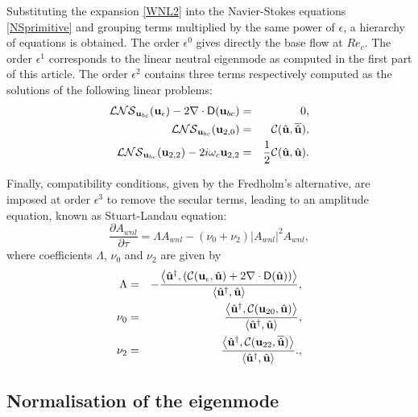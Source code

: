 \documentclass[twocolumn,10pt]{asme2ej}
\newcommand{\be}[1]{ \begin{equation} \label{#1}}
\newcommand{\ee}{\end{equation}}
\begin{document}
Substituting the expansion \ref{WNL2} into the Navier-Stokes equations \ref{NSprimitive} and grouping terms multiplied by the same power of $\epsilon$, a hierarchy of equations is obtained. The order $\epsilon^0$ gives directly the base flow at $Re_c$. The order $\epsilon^1$
corresponds to the linear neutral eigenmode as computed in the first part of this article.
The order $\epsilon^2$ contains three terms respectively computed as the solutions of the following linear problems:
\begin{eqnarray}
 {\cal LNS}_{{\bf u}_{bc}} ({\bf u}_\epsilon) - 2 \nabla \cdot {\mathsf D}({\bf u}_{bc}) &=&0,
\label{eq:LL1} \\
{\cal LNS}_{{\bf u}_{bc}} ({\bf u}_{2,0}) &=& {\cal C}(\hat{\bf u},\overline{\hat{\bf u}}), \label{eq:LL2} \\
{\cal LNS}_{{\bf u}_{bc}} ({\bf u}_{2,2}) - 2 i \omega_c {\bf u}_{2,2}  &=& \frac{1}{2} {\cal C}(\hat{\bf u},\hat{\bf u}). \label{eq:LL3}
 \end{eqnarray}

Finally, compatibility conditions, given by the Fredholm's alternative, are imposed at order $\epsilon^3$ to remove the secular terms, leading to an amplitude equation, known as Stuart-Landau equation:
\be{WNL3_2}
\frac{\partial A_{wnl}}{\partial \tau} = \Lambda A_{wnl} - (\nu_0+\nu_2)  |A_{wnl}|^2 A_{wnl},
\ee
where coefficients $\Lambda$, $\nu_0$ and $\nu_2$ are given by
\begin{eqnarray}
\Lambda &=& -\frac{ \left< {\hat{\bf u}}^\dag, 
\left( {\cal C}({\bf u}_\epsilon, \hat{\bf u}) + 2 \nabla \cdot  {\mathsf D}( \hat{\bf u}) \right) \right>}
{  \left<  \hat{\bf u}^\dag,\hat{\bf u} \right> },\label{LAMBDA}\\
\nu_0 &=& \frac{ \left< {\hat{\bf u}}^\dag,  {\cal C}({\bf u}_{20}, \hat{\bf u} ) \right>}
{  \left<  \hat{\bf u}^\dag,\hat{\bf u} \right> },\label{NU0}\\
\nu_2 &=& \frac{ \left< {\hat{\bf u}}^\dag,  {\cal C}({\bf u}_{22}, \overline{\hat{\bf u}})  \right>}
{  \left<  \hat{\bf u}^\dag,\hat{\bf u} \right> }.,\label{NU2}
 \end{eqnarray}


\subsection{Normalisation of the eigenmode}
\end{document}
